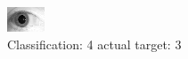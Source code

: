 \begin{figure}[h!]
\begin{center}
\includegraphics[width=0.60\columnwidth]{figures/ID1823_class_4_target_3.png}
\end{center}
\caption{ Classification: 4 actual target: 3}
\label{fig:ID1823_class_4_target_3}
\end{figure}
